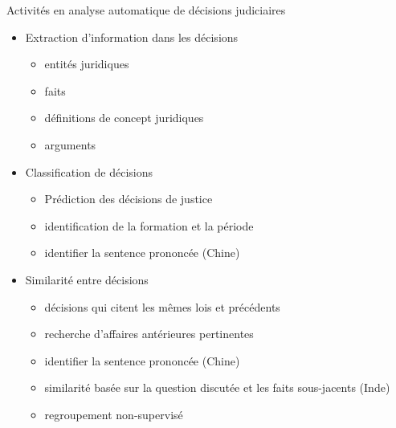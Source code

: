 \begin{frame}[t]{\mysubsectiontitle}
	Activités en analyse automatique de décisions judiciaires	
	\begin{itemize}\scriptsize
		\item Extraction d'information dans les décisions
		\begin{itemize}  \scriptsize
			\item entités juridiques \cite{Waltl2016lexia, andrew2018legalNerAndRelation}
			\item faits \cite{wyner2010extractlegalelts, wyner2010casefactors, Shulayeva2017recognfactprincip}
			\item définitions de concept juridiques \cite{Waltl2016lexia,waltl2017legaliegerman}
			\item arguments \cite{moens2007NBvsMaxent4arguments}
		\end{itemize}
		\item Classification de décisions
		\begin{itemize} \scriptsize
			\item Prédiction des décisions de justice \cite{Ashley2009classifCases, Aletras2016predictDecisionECHR}
			\item identification de la formation et la période \cite{Sulea2017predictareadecision,sulea2017legalEnsSVM}
			\item identifier la sentence prononcée (Chine) \cite{ma2018wmdchinesecase}
		\end{itemize}
		\item Similarité entre décisions 
		\begin{itemize}  \scriptsize
			\item décisions qui citent les mêmes lois et précédents \cite{nair2018judgsimassorule}
			\item recherche d'affaires antérieures pertinentes  \cite{thenmozhi2017legalprecedretriev}
			\item identifier la sentence prononcée (Chine) \cite{ma2018wmdchinesecase}
			\item similarité basée sur la question discutée et les faits sous-jacents (Inde) \cite{kumar2011judgmentsimilarity}
			\item regroupement non-supervisé \cite{raghuveer2012legalclusteringLDA}
		\end{itemize}
	\end{itemize}
\end{frame}

